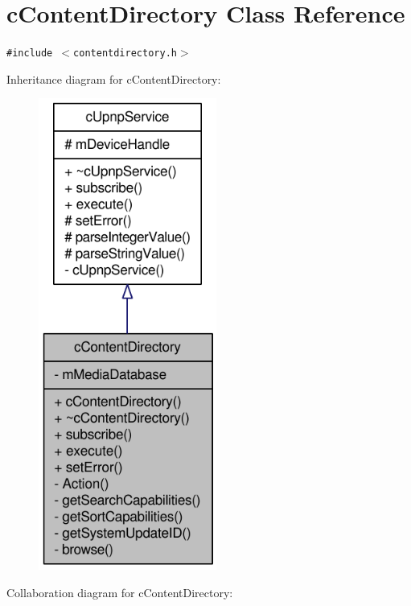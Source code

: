 \hypertarget{classcContentDirectory}{
\section{cContentDirectory Class Reference}
\label{classcContentDirectory}
}
{\tt \#include $<$contentdirectory.h$>$}

Inheritance diagram for cContentDirectory:\nopagebreak
\begin{figure}[H]
\begin{center}
\leavevmode
\includegraphics[width=166pt]{classcContentDirectory__inherit__graph}
\end{center}
\end{figure}
Collaboration diagram for cContentDirectory:\nopagebreak
